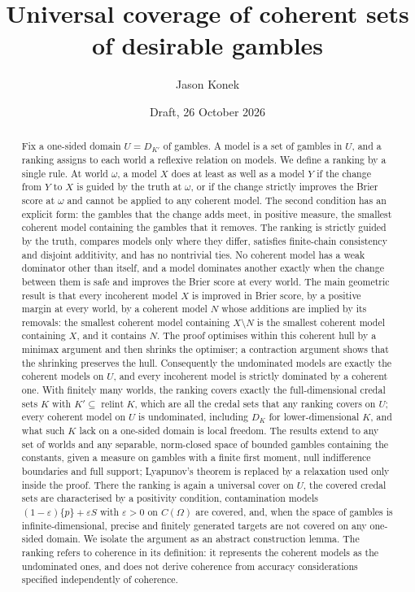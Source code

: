 \documentclass[11pt]{article}
\title{Universal coverage of coherent sets of desirable gambles}
\author{Jason Konek}
\date{Draft, 26 October 2026}
\DeclareMathOperator{\relint}{relint}
\theoremstyle{plain}
\theoremstyle{definition}
\theoremstyle{remark}
\begin{document}
\maketitle

\begin{abstract}
Fix a one-sided domain $U=D_{K'}$ of gambles. A model is a set of gambles in $U$, and a
ranking assigns to each world a reflexive relation on models. We define a ranking by a
single rule. At world $\omega$, a model $X$ does at least as well as a model $Y$ if the
change from $Y$ to $X$ is guided by the truth at $\omega$, or if the change strictly
improves the Brier score at $\omega$ and cannot be applied to any coherent model. The
second condition has an explicit form: the gambles that the change adds meet, in positive
measure, the smallest coherent model containing the gambles that it removes. The ranking is
strictly guided by the truth, compares models only where they differ, satisfies
finite-chain consistency and disjoint additivity, and has no nontrivial ties. No coherent
model has a weak dominator other than itself, and a model dominates another exactly when
the change between them is safe and improves the Brier score at every world. The main
geometric result is that every incoherent model $X$ is improved in Brier score, by a
positive margin at every world, by a coherent model $N$ whose additions are implied by its
removals: the smallest coherent model containing $X\setminus N$ is the smallest coherent
model containing $X$, and it contains $N$. The proof optimises within this coherent hull by
a minimax argument and then shrinks the optimiser; a contraction argument shows that the
shrinking preserves the hull. Consequently the undominated models are exactly the coherent
models on $U$, and every incoherent model is strictly dominated by a coherent one. With
finitely many worlds, the ranking covers exactly the full-dimensional credal sets $K$ with
$K'\subseteq\relint K$, which are all the credal sets that any ranking covers on $U$;
every coherent model on $U$ is undominated, including $D_K$ for lower-dimensional $K$, and
what such $K$ lack on a one-sided domain is local freedom. The results extend to any set
of worlds and any separable, norm-closed space of bounded gambles containing the
constants, given a measure on gambles with a finite first moment, null indifference
boundaries and full support; Lyapunov's theorem is replaced by a relaxation used only
inside the proof. There the ranking is again a universal cover on $U$, the covered credal
sets are characterised by a positivity condition, contamination models $(1-\varepsilon)
\{p\}+\varepsilon S$ with $\varepsilon>0$ on $C(\Omega)$ are covered, and, when the space
of gambles is infinite-dimensional, precise and finitely generated targets are not covered
on any one-sided domain. We isolate the argument as an abstract construction lemma. The
ranking refers to coherence in its definition: it represents the coherent models as the
undominated ones, and does not derive coherence from accuracy considerations specified
independently of coherence.
\end{abstract}
\end{document}
